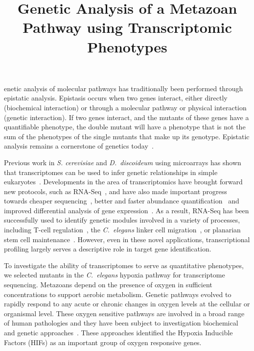 \documentclass[9pt,twocolumn,twoside]{pnas-new}
\title{Genetic Analysis of a Metazoan Pathway using Transcriptomic Phenotypes}
\newcommand{\cel}{\emph{C.~elegans}}
\newcommand{\dicty}{\emph{D.~discoideum}}
\begin{document}
\verticaladjustment{-2pt}

\maketitle
\thispagestyle{firststyle}

enetic analysis of molecular pathways has traditionally been performed
through epistatic analysis. Epistasis occurs when two genes interact, either
directly (biochemical interaction) or through a molecular pathway or physical
interaction (genetic interaction). If two genes interact, and the mutants of
these genes have a quantifiable phenotype, the double mutant will have a
phenotype that is not the sum of the phenotypes of the single mutants that make
up its genotype. Epistatic analysis remains a cornerstone of genetics
today~\cite{Phillips2008}.

Previous work in \emph{S. cerevisiae} and \dicty{} using microarrays has shown
that transcriptomes can be used to infer genetic relationships in simple
eukaryotes~\cite{Hughes2000, VanDriessche2005}.
Developments in the area of transcriptomics have brought forward new protocols,
such as RNA-Seq~\cite{Mortazavi2008}, and have also made important progress
towards cheaper sequencing~\cite{Metzker2010}, better and faster abundance
quantification~\cite{Patro2014, Bray2015,Patro2015} and improved differential
analysis of gene expression~\cite{Pimentel2016,Trapnell2013}.
As a result, RNA-Seq has been successfully used to identify genetic %
modules involved in a variety of processes, including T-cell
regulation~\cite{Singer2016,Shalek2013}, the \cel{} linker cell
migration~\cite{Schwarz2012}, or planarian stem cell
maintenance~\cite{VanWolfswinkel2014,Scimone2014}. However, even in these novel
applications, transcriptional profiling largely serves a descriptive role in
target gene identification.

To investigate the ability of transcriptomes to serve as quantitative phenotypes,
we selected mutants in the \cel{} hypoxia pathway for transcriptome sequencing.
Metazoans depend on the presence of oxygen in sufficient concentrations to
support aerobic metabolism. Genetic pathways evolved to rapidly respond to any
acute or chronic changes in oxygen levels at the cellular or organismal level.
These oxygen sensitive pathways are involved in a broad range of human
pathologies and they have been subject to investigation biochemical and
genetic approaches~\cite{Semenza2012}. These approaches identified the Hypoxia
Inducible Factors (HIFs) as an important group of oxygen responsive genes.
\end{document}
